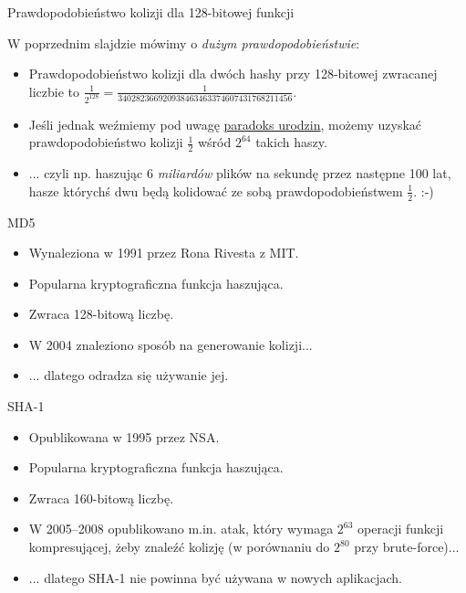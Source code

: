 \begin{frame}{Prawdopodobieństwo kolizji dla 128-bitowej funkcji}
	
	W poprzednim slajdzie mówimy o \emph{dużym prawdopodobieństwie}:

	\begin{itemize}
		\item Prawdopodobieństwo kolizji dla dwóch hashy przy 128-bitowej zwracanej liczbie to $\frac{1}{2^{128}}=\frac{1}{340282366920938463463374607431768211456}$.
		
		\item Jeśli jednak weźmiemy pod uwagę \href{http://en.wikipedia.org/wiki/Birthday_problem}{paradoks urodzin}, możemy uzyskać prawdopodobieństwo kolizji $\frac{1}{2}$ wśród $2^{64}$ takich haszy.
		
		\item ... czyli np. haszując 6 \emph{miliardów} plików na sekundę przez następne 100 lat, hasze którychś dwu będą kolidować ze sobą prawdopodobieństwem $\frac{1}{2}$. :-)
	\end{itemize}	
	
\end{frame}

\begin{frame}{MD5}
	\begin{itemize}
		\item Wynaleziona w 1991 przez Rona Rivesta z MIT.
		\item Popularna kryptograficzna funkcja haszująca.
		\item Zwraca 128-bitową liczbę.
		\item W 2004 znaleziono sposób na generowanie kolizji...
		\item ... dlatego odradza się używanie jej.
	\end{itemize}
\end{frame}

\begin{frame}{SHA-1}
	\begin{itemize}
		\item Opublikowana w 1995 przez NSA.
		\item Popularna kryptograficzna funkcja haszująca.
		\item Zwraca 160-bitową liczbę.
		\item W 2005--2008 opublikowano m.in. atak, który wymaga $2^{63}$ operacji funkcji kompresującej, żeby znaleźć kolizję (w porównaniu do $2^{80}$ przy brute-force)...
		\item ... dlatego SHA-1 nie powinna być używana w nowych aplikacjach.
	\end{itemize}
\end{frame}

